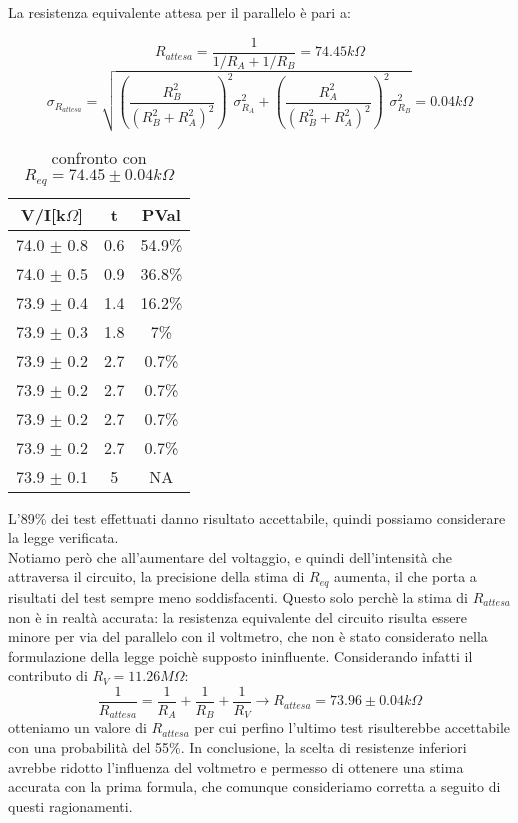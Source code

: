 \documentclass[a4paper]{article}
\theoremstyle{definition}
\begin{document}
\noindent La resistenza equivalente attesa per il parallelo è pari a:

\[R_{attesa} = \frac{1}{1/R_A + 1/R_B} = 74.45k\Omega\]
\[ \sigma_{R_{attesa} }= \sqrt{\left(\frac{R^{2}_{B}}{(R^{2}_{B} + R^{2}_{A})^{2}}  \right)^{2}\sigma^{2}_{R_A} + \left(\frac{R^{2}_{A}}{(R^{2}_{B} + R^{2}_{A})^{2}}\right)^{2}\sigma^{2}_{R_B}} = 0.04k\Omega\]


\begin{table}[!htbp]
\centering
    \captionsetup{labelformat=empty}
        \caption{confronto con \(R_{eq} = 74.45 \pm 0.04k\Omega\)}
    \begin{tabular}{c|c|c}
        V/I[k$\Omega$] & t & PVal\\
        \hline
        \hline
        74.0 \(\pm\) 0.8 & 0.6 & 54.9\%\\
        74.0 \(\pm\) 0.5 & 0.9  & 36.8\%\\
        73.9 \(\pm\) 0.4 & 1.4 & 16.2\%\\
        73.9 \(\pm\) 0.3 & 1.8 & 7\%\\
        73.9 \(\pm\) 0.2 &  2.7& 0.7\%\\
        73.9 \(\pm\) 0.2 & 2.7 & 0.7\%\\
        73.9 \(\pm\) 0.2 & 2.7 &0.7\%\\
        73.9 \(\pm\) 0.2 & 2.7 &0.7\%\\
        73.9 \(\pm\) 0.1 & 5 & NA\\
        
        \hline
        \hline
    \end{tabular}
\end{table}

\noindent L'89\% dei test effettuati danno risultato accettabile, quindi possiamo considerare la legge verificata.\\ Notiamo però che all'aumentare del voltaggio, e quindi dell'intensità che attraversa il circuito, la precisione della stima di \(R_{eq}\) aumenta, il che porta a risultati del test sempre meno soddisfacenti. Questo solo perchè la stima di \(R_{attesa}\) non è in realtà accurata: la resistenza equivalente del circuito risulta essere minore per via del parallelo con il voltmetro, che non è stato considerato nella formulazione della legge poichè supposto ininfluente. Considerando infatti il contributo di \(R_{V} = 11.26 M \Omega\): \[\frac{1}{R_{attesa}} = \frac{1}{R_{A}} + \frac{1}{R_{B}} + \frac{1}{R_{V}} \rightarrow R_{attesa} = 73.96 \pm 0.04 k\Omega\]
otteniamo un valore di \(R_{attesa}\) per cui perfino l'ultimo test risulterebbe accettabile con una probabilità del 55\%. In conclusione, la scelta di resistenze inferiori avrebbe ridotto l'influenza del voltmetro e permesso di ottenere una stima accurata con la prima formula, che comunque consideriamo corretta a seguito di questi ragionamenti.
\end{document}
